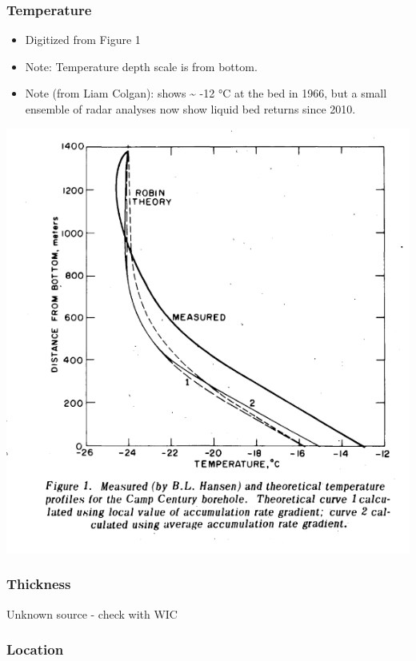 \documentclass[article,a4paper,times,11pt,twoside]{article}
\begin{document}
\subsubsection{Temperature}
\label{sec:org729292c}

\begin{itemize}
\item Digitized from \textcite{weertman_1968} Figure 1
\item Note: Temperature depth scale is from bottom.
\item Note (from Liam Colgan): \textcite{weertman_1968} shows \textasciitilde{} -12 °C at the bed in 1966, but a small ensemble of radar analyses now show liquid bed returns since 2010.
\end{itemize}


\begin{center}
\includegraphics[width=.9\linewidth]{camp_century/weertman_1968_fig1.png}
\end{center}

\subsubsection{Thickness}
\label{sec:orgf5157a5}

Unknown source - check with WIC

\subsubsection{Location}
\label{sec:orgc44a740}
\end{document}
